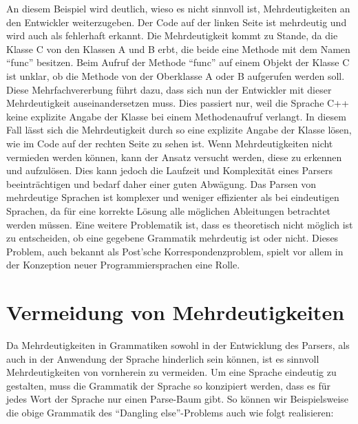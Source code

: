 \documentclass[runningheads]{llncs}
\begin{document}
    An diesem Beispiel wird deutlich,
    wieso es nicht sinnvoll ist, Mehrdeutigkeiten an den Entwickler weiterzugeben.
    Der Code auf der linken Seite ist mehrdeutig und wird auch als fehlerhaft erkannt.
    Die Mehrdeutigkeit kommt zu Stande, da die Klasse C von den Klassen A und B erbt,
    die beide eine Methode mit dem Namen ``func'' besitzen.
    Beim Aufruf der Methode ``func'' auf einem Objekt der Klasse C ist unklar,
    ob die Methode von der Oberklasse A oder B aufgerufen werden soll.
    Diese Mehrfachvererbung führt dazu, dass sich nun der Entwickler mit dieser Mehrdeutigkeit auseinandersetzen muss.
    Dies passiert nur, weil die Sprache C++ keine explizite Angabe der Klasse bei einem Methodenaufruf verlangt.
    In diesem Fall lässt sich die Mehrdeutigkeit durch so eine explizite Angabe der Klasse lösen,
    wie im Code auf der rechten Seite zu sehen ist.
    Wenn Mehrdeutigkeiten nicht vermieden werden können,
    kann der Ansatz versucht werden, diese zu erkennen und aufzulösen.
    Dies kann jedoch die Laufzeit und Komplexität eines Parsers beeinträchtigen und bedarf daher einer guten Abwägung.
    Das Parsen von mehrdeutige Sprachen ist komplexer und weniger effizienter als bei eindeutigen Sprachen,
    da für eine korrekte Lösung alle möglichen Ableitungen betrachtet werden müssen.
    Eine weitere Problematik ist, dass es theoretisch nicht möglich ist zu entscheiden,
    ob eine gegebene Grammatik mehrdeutig ist oder nicht.
    Dieses Problem, auch bekannt als Post'sche Korrespondenzproblem,
    spielt vor allem in der Konzeption neuer Programmiersprachen eine Rolle.


    \section{Vermeidung von Mehrdeutigkeiten}\label{sec:vermeidung-von-mehrdeutigkeiten}

    Da Mehrdeutigkeiten in Grammatiken sowohl in der Entwicklung des Parsers,
    als auch in der Anwendung der Sprache hinderlich sein können,
    ist es sinnvoll Mehrdeutigkeiten von vornherein zu vermeiden.
    Um eine Sprache eindeutig zu gestalten,
    muss die Grammatik der Sprache so konzipiert werden,
    dass es für jedes Wort der Sprache nur einen Parse-Baum gibt.
    So können wir Beispielsweise die obige Grammatik des ``Dangling else''-Problems auch wie folgt realisieren\cite{Abrahams1966}:
\end{document}
